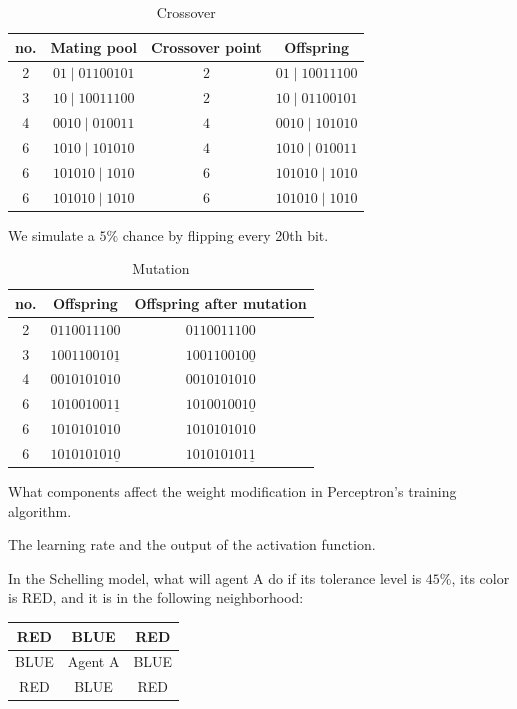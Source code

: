 \documentclass[a4paper,12pt,answers]{exam}
\begin{document}
\begin{questions}
\begin{solution}
		\begin{table}[H]
			\centering
			\begin{tabular}{|c|c||c|c|}
				\hline
				no. & Mating pool & Crossover point & Offspring \\
				\hline
				2 & $01 \mid 01100101$ & $2$ & $01 \mid 10011100$ \\
				3 & $10 \mid 10011100$ & $2$ & $10 \mid 01100101$ \\
				4 & $0010 \mid 010011$ & $4$ & $0010 \mid 101010$   \\
				6 & $1010 \mid 101010$ & $4$ & $1010 \mid 010011$  \\
				6 & $101010 \mid 1010$ & $6$ & $101010 \mid 1010$  \\
				6 & $101010 \mid 1010$ & $6$ & $101010 \mid 1010$ \\
				\hline
			\end{tabular}
			\caption{Crossover}
		\end{table}
		
		We simulate a $5\%$ chance by flipping every 20th bit.
		
		\begin{table}[H]
			\centering
			\begin{tabular}{|c|c||c|}
				\hline
				no. & Offspring & Offspring after mutation \\
				\hline
				2 & $0110011100$ & $0110011100$  \\
				3 & $100110010\underline{1}$ & $100110010\underline{0}$  \\
				4 & $0010101010$ & $0010101010$    \\
				6 & $101001001\underline{1}$ & $101001001\underline{0}$   \\
				6 & $1010101010$ & $1010101010$   \\
				6 & $101010101\underline{0}$ & $101010101\underline{1}$  \\
				\hline
			\end{tabular}
			\caption{Mutation}
		\end{table}
	\end{solution}
	
	\question[15]
	What components affect the weight modification in Perceptron's training algorithm.
	
	\begin{solution}
		The learning rate and the output of the activation function.
	\end{solution}
	
	\question[15]
	In the Schelling model, what will agent A do if its tolerance level is $45\%$, its color is RED, and it is in the following neighborhood:
	\begin{table}[H]
		\centering
		\begin{tabular}{|c|c|c|}
			\hline
			RED & BLUE & RED \\ \hline
			BLUE & Agent A & BLUE \\ \hline
			RED & BLUE & RED \\ \hline
		\end{tabular}
	\end{table}
	

\end{questions}
\end{document}
